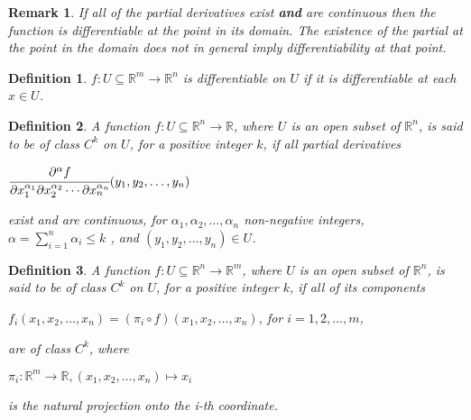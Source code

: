 \documentclass[12pt]{article}
\newcommand{\real}{\mathbb{R}}
\newtheorem{defn}{Definition}[thm]
\newtheorem*{remark}{Remark}
\begin{document}
\begin{remark}
  If all of the partial derivatives exist \textbf{and} are continuous then the function is differentiable at the point in its domain. The existence of the partial at the point in the domain does not in general imply differentiability at that point.
\end{remark}
\begin{defn}
  $f: U \subseteq \real^m \to \real^n$ is differentiable on $U$ if it is differentiable at each $x \in U$.
\end{defn}

\begin{defn}
  A function $f: U \subseteq\real^n \to \real$, where $U$ is an open subset of $\real^n$, is said to be of class $C^k$ on $U$, for a positive integer $k$, if all partial derivatives
  \begin{center}
    $\cfrac{\partial^{\alpha}f}{\partial x_1^{\alpha_1}\partial x_2^{\alpha_2}\cdots\partial x_n^{\alpha_n}}(y_1,y_2,\dots,y_n)$
    
  \end{center}
  exist and are continuous, for $\alpha_1, \alpha_2, \dots, \alpha_n $ non-negative integers, $\alpha = \sum\limits_{i=1}^n \alpha_i \leq k$
, and $(y_1,y_2,\dots,y_n) \in U$.
\end{defn}

\begin{defn}
  A function $f: U \subseteq \real^n \to \real^m$, where $U$ is an open subset of $\real^n$, is said to be of class $C^k$ on $U$, for a positive integer $k$, if all of its components
  \begin{center}
    $f_i(x_1,x_2,\dots,x_n) = (\pi_i \circ f)(x_1,x_2,\dots,x_n)$, for $i=1, 2, \dots, m$,
  \end{center}
  are of class $C^k$, where

  \begin{center}
    $\pi_i: \real^m \to \real, (x_1,x_2,\dots,x_n) \mapsto x_i$
  \end{center}

  is the natural projection onto the i-th coordinate.
\end{defn}
\end{document}
